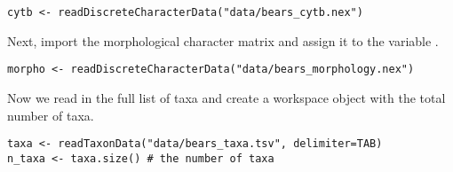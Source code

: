 {\tt \begin{snugshade*}
\begin{lstlisting}
cytb <- readDiscreteCharacterData("data/bears_cytb.nex") 
\end{lstlisting}
\end{snugshade*}}

Next, import the morphological character matrix and assign it to the variable . 
{\tt \begin{snugshade*}
\begin{lstlisting}
morpho <- readDiscreteCharacterData("data/bears_morphology.nex")
\end{lstlisting}
\end{snugshade*}}

%

Now we read in the full list of taxa and create a workspace object with the total number of taxa. 

{\tt \begin{snugshade*}
\begin{lstlisting}
taxa <- readTaxonData("data/bears_taxa.tsv", delimiter=TAB)
n_taxa <- taxa.size() # the number of taxa
\end{lstlisting}
\end{snugshade*}}

